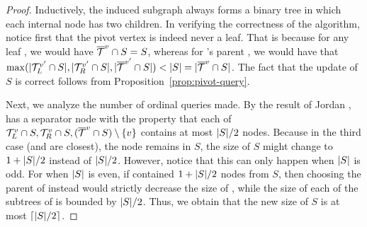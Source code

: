 \begin{proof}
Inductively, the induced subgraph  always forms a binary tree
in which each internal node has two children.
In verifying the correctness of the algorithm,
notice first that the pivot vertex \Vertex is indeed never a leaf.
That is because for any leaf \Vertex, we would have
$\Subtree{\Vertex} \cap S = S$,
whereas for \Vertex's parent \VertexP, we would have that
$\max(\SetCard{\Subtree[L]{\VertexP} \cap S},
	\SetCard{\Subtree[R]{\VertexP} \cap S},
	\SetCard{\Subtree{\VertexP} \cap S}) 
	< \SetCard{S} = \SetCard{\Subtree{\Vertex} \cap S}$.
The fact that the update of $S$ is correct follows from
Proposition~\ref{prop:pivot-query}.



Next, we analyze the number of ordinal queries made.
By the result of Jordan \cite{jordan:1869:assemblages},
 has a separator node \Vertex with the property that each of 
$\Subtree[L]{\Vertex} \cap S, \Subtree[R]{\Vertex} \cap S,
(\Subtree{\Vertex} \cap S) \setminus \Set{\Vertex}$
contains at most $| S |/2$ nodes.
Because in the third case (\ElSL and \ElSR are closest),
the node \Vertex remains in $S$,
the size of $S$ might change to $1 + | S |/2$ instead of $| S |/2$.
However, notice that this can only happen when $| S |$ is odd.
For when $| S |$ is even, if \Subtree{\Vertex} contained
$1 + | S |/2$ nodes from $S$,
then choosing the parent \VertexP of \Vertex instead
would strictly decrease the size of \Subtree{\VertexP},
while the size of each of the subtrees of \VertexP is bounded by $| S |/2$.
Thus, we obtain that the new size of $S$ is at most $\left\lceil{\ensuremath{| S |}/2}\right\rceil$.


\end{proof}
